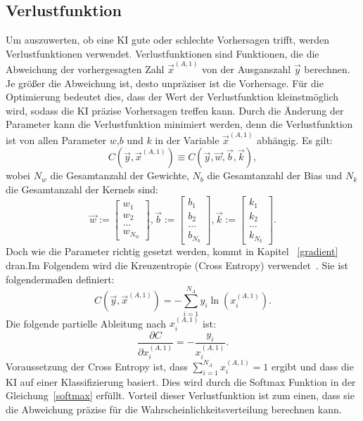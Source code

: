 \documentclass[11pt]{article}
\begin{document}
\subsection{Verlustfunktion}\label{lost}
Um auszuwerten, ob eine KI gute oder schlechte Vorhersagen trifft, werden Verlustfunktionen verwendet.
Verlustfunktionen sind Funktionen, die die Abweichung der vorhergesagten Zahl $\vec{x}^{(A,1)}$ von der Ausganszahl $\vec{y}$ berechnen.
Je größer die Abweichung ist, desto unpräziser ist die Vorhersage. Für die
Optimierung bedeutet dies, dass der Wert der Verlustfunktion kleinstmöglich wird, sodass die KI präzise Vorhersagen treffen kann. Durch die Änderung der Parameter
kann die Verlustfunktion minimiert werden, denn die Verlustfunktion ist von allen Parameter $w$,$b$ und $k$ in der Variable $\vec{x}^{(A,1)}$ abhängig.
Es gilt:
\begin{equation}
    C(\vec{y},\vec{x}^{(A,1)}) \equiv C(\vec{y},\vec{w},\vec{b},\vec{k}),
\end{equation}
 wobei $N_w$ die Gesamtanzahl der Gewichte, $N_b$ die Gesamtanzahl der Bias und $N_k$ die Gesamtanzahl der Kernels sind:
\begin{equation}
    \vec{w} := \begin{bmatrix} w_{1} \\ w_{2} \\ \ldots \\ w_{N_w} \end{bmatrix},
    \vec{b} := \begin{bmatrix} b_{1} \\ b_{2} \\ \ldots \\ b_{N_b} \end{bmatrix},
    \vec{k} := \begin{bmatrix} k_{1} \\ k_{2} \\ \ldots \\ k_{N_k} \end{bmatrix}.
\end{equation}
Doch wie die Parameter richtig gesetzt werden, kommt in Kapitel
~\ref{gradient} dran.\@ Im Folgendem wird die Kreuzentropie (Cross Entropy) verwendet~\cite{19}. Sie ist folgendermaßen definiert:
\begin{equation}
    C(\vec{y},\vec{x}^{(A,1)}) = -\sum_{i=1}^{N_A} y_i \ln(x_i^{(A,1)}).
\end{equation}
Die folgende partielle Ableitung nach $x_i^{(A,1)}$ ist:
\begin{equation}
    \frac{\partial C}{\partial x_i^{(A,1)}} = -\frac{y_i}{x_i^{(A,1)}}.
\end{equation}
Voraussetzung der Cross Entropy ist, dass $\sum_{i=1}^{N_A} x_i^{(A,1)} = 1$ ergibt und dass die KI auf einer Klassifizierung basiert. Dies wird durch die Softmax Funktion in der Gleichung~\ref{softmax} erfüllt.
Vorteil dieser Verlustfunktion ist zum einen, dass sie die Abweichung präzise für die Wahrscheinlichkeitsverteilung berechnen kann.
\end{document}
